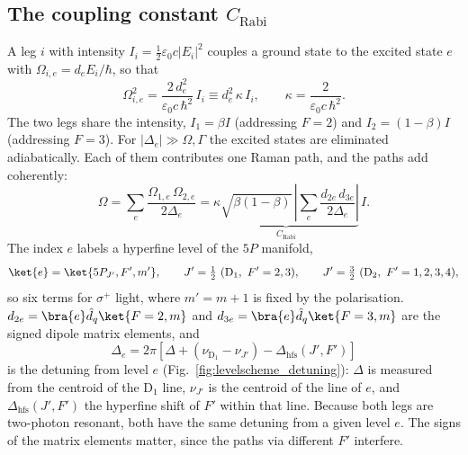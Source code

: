 \subsection*{The coupling constant $C_\text{Rabi}$}
A leg $i$ with intensity $I_i=\tfrac12\varepsilon_0c|E_i|^2$ couples a ground state to the excited
state $e$ with $\Omega_{i,e}=d_eE_i/\hbar$, so that
\begin{equation}
\Omega_{i,e}^2=\frac{2\,d_e^2}{\varepsilon_0c\,\hbar^2}\,I_i\equiv d_e^2\,\kappa\,I_i,
\qquad \kappa=\frac{2}{\varepsilon_0c\,\hbar^2}.
\end{equation}
The two legs share the intensity, $I_1=\beta I$ (addressing $F=2$) and $I_2=(1-\beta)I$ (addressing
$F=3$). For $|\Delta_e|\gg\Omega,\Gamma$ the excited states are eliminated adiabatically. Each of
them contributes one Raman path, and the paths add coherently:
\begin{equation}
\Omega=\sum_e\frac{\Omega_{1,e}\,\Omega_{2,e}}{2\Delta_e}
=\underbrace{\kappa\sqrt{\beta(1-\beta)}\,\left|\sum_e\frac{d_{2e}\,d_{3e}}{2\Delta_e}\right|}_{C_\text{Rabi}}\,I.
\end{equation}
The index $e$ labels a hyperfine level of the $5P$ manifold,
\begin{equation}
\ket{e}=\ket{5P_{J'},F',m'},\qquad
J'=\tfrac12\ (\mathrm{D}_1,\ F'=2,3),\qquad
J'=\tfrac32\ (\mathrm{D}_2,\ F'=1,2,3,4),
\end{equation}
so six terms for $\sigma^+$ light, where $m'=m+1$ is fixed by the polarisation.
$d_{2e}=\bra{e}\hat d_q\ket{F=2,m}$ and $d_{3e}=\bra{e}\hat d_q\ket{F=3,m}$ are the signed dipole
matrix elements, and
\begin{equation}
\Delta_e=2\pi\left[\Delta+\left(\nu_{\mathrm{D}_1}-\nu_{J'}\right)-\Delta_\text{hfs}(J',F')\right]
\end{equation}
is the detuning from level $e$ (Fig.~\ref{fig:levelscheme_detuning}): $\Delta$ is measured from the
centroid of the D$_1$ line, $\nu_{J'}$ is the centroid of the line of $e$, and $\Delta_\text{hfs}(J',F')$
the hyperfine shift of $F'$ within that line. Because both legs are two-photon resonant, both have
the same detuning from a given level $e$. The signs of the matrix elements matter, since the paths
via different $F'$ interfere.

